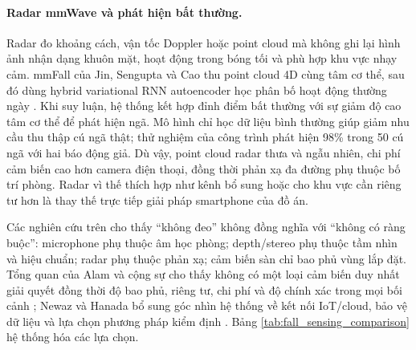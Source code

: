 \paragraph{Radar mmWave và phát hiện bất thường.}
Radar đo khoảng cách, vận tốc Doppler hoặc point cloud mà không ghi lại hình ảnh nhận dạng khuôn mặt, hoạt động trong bóng tối và phù hợp khu vực nhạy cảm. mmFall của Jin, Sengupta và Cao thu point cloud 4D cùng tâm cơ thể, sau đó dùng hybrid variational RNN autoencoder học phân bố hoạt động thường ngày . Khi suy luận, hệ thống kết hợp đỉnh điểm bất thường với sự giảm độ cao tâm cơ thể để phát hiện ngã. Mô hình chỉ học dữ liệu bình thường giúp giảm nhu cầu thu thập cú ngã thật; thử nghiệm của công trình phát hiện 98\% trong 50 cú ngã với hai báo động giả. Dù vậy, point cloud radar thưa và ngẫu nhiên, chi phí cảm biến cao hơn camera điện thoại, đồng thời phản xạ đa đường phụ thuộc bố trí phòng. Radar vì thế thích hợp như kênh bổ sung hoặc cho khu vực cần riêng tư hơn là thay thế trực tiếp giải pháp smartphone của đồ án.

Các nghiên cứu trên cho thấy ``không đeo'' không đồng nghĩa với ``không có ràng buộc'': microphone phụ thuộc âm học phòng; depth/stereo phụ thuộc tầm nhìn và hiệu chuẩn; radar phụ thuộc phản xạ; cảm biến sàn chỉ bao phủ vùng lắp đặt. Tổng quan của Alam và cộng sự cho thấy không có một loại cảm biến duy nhất giải quyết đồng thời độ bao phủ, riêng tư, chi phí và độ chính xác trong mọi bối cảnh ; Newaz và Hanada bổ sung góc nhìn hệ thống về kết nối IoT/cloud, bảo vệ dữ liệu và lựa chọn phương pháp kiểm định . Bảng \ref{tab:fall_sensing_comparison} hệ thống hóa các lựa chọn.

